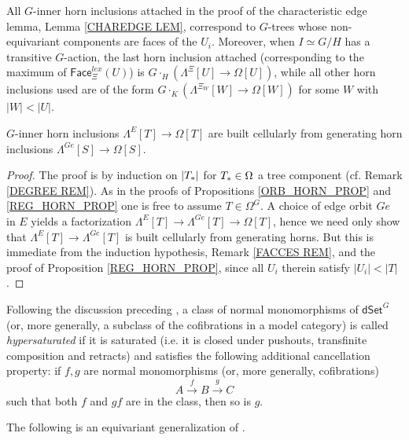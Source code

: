 \documentclass[a4paper,10pt
 ,draft
]{article}%
\begin{document}
\begin{remark}\label{FACCES REM}
All $G$-inner horn inclusions attached in the proof of the characteristic edge lemma, Lemma \ref{CHAREDGE LEM}, correspond to $G$-trees whose non-equivariant components are faces of the $U_i$. Moreover, when $I \simeq G/H$ has a transitive $G$-action, the last horn inclusion attached (corresponding to the maximum of $\mathsf{Face}^{lex}_{\Xi}(U)$) is
$G \cdot_H \left( \Lambda^{\Xi}[U] \to \Omega[U] \right)$, while all other horn inclusions used are of the form
$G \cdot_K (\Lambda^{\Xi_W}[W] \to \Omega[W])$ for some $W$ with $|W| < |U|$.
\end{remark}


\begin{corollary}\label{REGGENHORN COR}
$G$-inner horn inclusions
$\Lambda^{E}[T] \to \Omega[T]$
are built cellularly from generating horn inclusions
$\Lambda^{Ge}[S] \to \Omega[S]$.
\end{corollary}

\begin{proof}
	The proof is by induction on $|T_{\**}|$ for $T_{\**}\in \Omega$ a tree component (cf. Remark \ref{DEGREE REM}). As in the proofs of Propositions \ref{ORB_HORN_PROP} and \ref{REG_HORN_PROP} one is free to assume $T \in \Omega^G$.	
	A choice of edge orbit $Ge$ in $E$ yields a factorization
	$\Lambda^{E}[T] \to \Lambda^{Ge}[T] \to \Omega[T]$,
	hence we need only show that 
	$\Lambda^{E}[T] \to \Lambda^{Ge}[T]$ is built cellularly from generating horns. 
	But this is immediate from the induction hypothesis,
	Remark \ref{FACCES REM}, and the proof of Proposition \ref{REG_HORN_PROP}, since all
	$U_{i}$ therein satisfy $|U_i|<|T|$.
\end{proof}


Following the discussion preceding \cite[Prop. 3.6.8]{HHM16},
a class of normal monomorphisms of $\mathsf{dSet}^G$
(or, more generally, a subclass of the cofibrations in a model category) is called
\textit{hypersaturated} if it is saturated (i.e. it is closed under
pushouts, transfinite composition and retracts) and satisfies the following additional cancellation property: 
if $f,g$ are normal monomorphisms (or, more generally, cofibrations)
\begin{equation}\label{CANCEL_EQ}
A \xrightarrow{f} B \xrightarrow{g} C
\end{equation}
such that both $f$ and $gf$ are in the class, then so is $g$.

The following is an equivariant generalization of 
\cite[Props. 2.4 and 2.5]{CM13a}.
\end{document}
